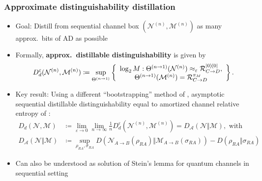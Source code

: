 \documentclass[usenames,dvipsnames,handout]{beamer}
\begin{document}
\begin{frame}
\frametitle{Approximate distinguishability distillation}

\begin{itemize}

\pause
\item Goal: Distill from sequential channel box $(\mathcal{N}^{(n)},\mathcal{M}^{(n)})$ as many approx.~bits of AD as possible

\pause
\item Formally, {\color{MidnightBlue}\textbf{approx.~distillable distinguishability}} is given by
\begin{multline*}
D_{d}^{\varepsilon}(\mathcal{N}^{(n)},\mathcal{M}^{(n)})\coloneqq 
\sup_{\Theta^{(n\rightarrow 1)}}\left\{
\begin{array}
[c]{c}%
\log_{2}M:\Theta^{(n\rightarrow1)}(\mathcal{N}^{(n)}) \approx_{\varepsilon}\mathcal{R}%
_{C\rightarrow D}^{|0\rangle\!\langle0|},\\
\Theta^{(n\rightarrow1)}(\mathcal{M}^{(n)})=\mathcal{R}_{C\rightarrow D}%
^{\pi_{M}}%
\end{array}
\right\}  .
\end{multline*}

\pause
\item Key result: Using a different ``bootstrapping'' method of \cite{GFWRSCW18}, asymptotic sequential distillable distinguishability equal to amortized channel relative entropy of \cite{BHKW18}:
\begin{align*}
D_{d}(\mathcal{N},\mathcal{M}) & \coloneqq  \lim_{\varepsilon \to 0}\lim_{n \to \infty}\frac{1}{n} D_{d}^{\varepsilon}(\mathcal{N}^{(n)},\mathcal{M}^{(n)}) = D_{\mathcal{A}}(\mathcal{N}\Vert\mathcal{M}), \text{ with }\\
D_{\mathcal{A}}(\mathcal{N}\Vert\mathcal{M}) & \coloneqq 
\sup_{\rho_{RA}, \sigma_{RA}} D(\mathcal{N}_{A\to B}(\rho_{RA})\Vert \mathcal{M}_{A \to B}(\sigma_{RA})) - 
D(\rho_{RA}\Vert \sigma_{RA})
\end{align*}

\pause
\item Can also be understood as solution of Stein's lemma for quantum channels in sequential setting

\end{itemize}

\end{frame}
\end{document}
